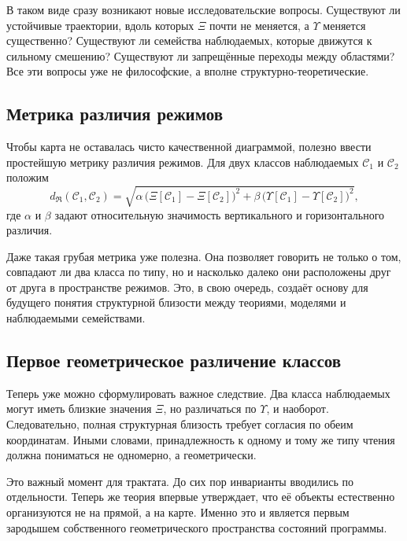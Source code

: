 \documentclass[12pt,a4paper]{article}
\begin{document}
В таком виде сразу возникают новые исследовательские вопросы. Существуют ли устойчивые траектории, вдоль которых \(\Xi\) почти не меняется, а \(\Upsilon\) меняется существенно? Существуют ли семейства наблюдаемых, которые движутся к сильному смешению? Существуют ли запрещённые переходы между областями? Все эти вопросы уже не философские, а вполне структурно-теоретические.

\subsection{Метрика различия режимов}

Чтобы карта не оставалась чисто качественной диаграммой, полезно ввести простейшую метрику различия режимов. Для двух классов наблюдаемых \(\mathcal{C}_1\) и \(\mathcal{C}_2\) положим
\begin{equation}
 d_{\mathfrak{R}}(\mathcal{C}_1,\mathcal{C}_2)
 =
 \sqrt{
 \alpha\,\big(\Xi[\mathcal{C}_1]-\Xi[\mathcal{C}_2]\big)^2
 +
 \beta\,\big(\Upsilon[\mathcal{C}_1]-\Upsilon[\mathcal{C}_2]\big)^2
 },
\end{equation}
где \(\alpha\) и \(\beta\) задают относительную значимость вертикального и горизонтального различия.

Даже такая грубая метрика уже полезна. Она позволяет говорить не только о том, совпадают ли два класса по типу, но и насколько далеко они расположены друг от друга в пространстве режимов. Это, в свою очередь, создаёт основу для будущего понятия структурной близости между теориями, моделями и наблюдаемыми семействами.

\subsection{Первое геометрическое различение классов}

Теперь уже можно сформулировать важное следствие. Два класса наблюдаемых могут иметь близкие значения \(\Xi\), но различаться по \(\Upsilon\), и наоборот. Следовательно, полная структурная близость требует согласия по обеим координатам. Иными словами, принадлежность к одному и тому же типу чтения должна пониматься не одномерно, а геометрически.

Это важный момент для трактата. До сих пор инварианты вводились по отдельности. Теперь же теория впервые утверждает, что её объекты естественно организуются не на прямой, а на карте. Именно это и является первым зародышем собственного геометрического пространства состояний программы.
\end{document}
